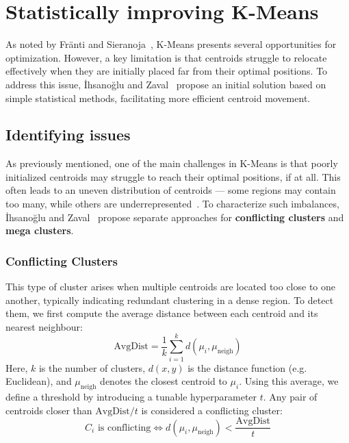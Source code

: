 \documentclass[10pt,twocolumn,letterpaper]{article}
\begin{document}

\section{Statistically improving K-Means}\label{sec:statistically-improving-k-means}

As noted by Fränti and Sieranoja~\cite{FRANTI201995}, K-Means presents several
opportunities for optimization. However, a key limitation is that centroids
struggle to relocate effectively when they are initially placed far from their
optimal positions. To address this issue, İhsanoğlu and
Zaval~\cite{Abdullah10601123} propose an initial solution based on simple
statistical methods, facilitating more efficient centroid movement.


\subsection{Identifying issues}\label{subsec:identifying-issues}

As previously mentioned, one of the main challenges in K-Means is that poorly
initialized centroids may struggle to reach their optimal positions, if at all.
This often leads to an uneven distribution of centroids — some regions may
contain too many, while others are underrepresented~\cite{FRANTI201995}. To
characterize such imbalances, İhsanoğlu and Zaval~\cite{Abdullah10601123}
propose separate approaches for \textbf{conflicting clusters} and \textbf{mega
    clusters}.

\subsubsection{Conflicting Clusters}

This type of cluster arises when multiple centroids are located too close to
one another, typically indicating redundant clustering in a dense region. To
detect them, we first compute the average distance between each centroid and
its nearest neighbour:
\begin{equation}
    \label{eq:avgDist}
    \text{AvgDist} = \frac{1}{k} \sum_{i=1}^{k} d(\mu_i, \mu_{\text{neigh}})
\end{equation}
Here, $k$ is the number of clusters, $d(x,y)$ is the distance function (e.g.
Euclidean), and $\mu_{\text{neigh}}$ denotes the closest centroid to $\mu_i$.
Using this average, we define a threshold by introducing a tunable
hyperparameter $t$. Any pair of centroids closer than $\text{AvgDist} / t$ is
considered a conflicting cluster:
\begin{equation}
    \label{eq:conflicting-cluster}
    C_i \text{ is conflicting} \iff d(\mu_i, \mu_{\text{neigh}}) < \frac{\text{AvgDist}}{t}
\end{equation}
\end{document}
